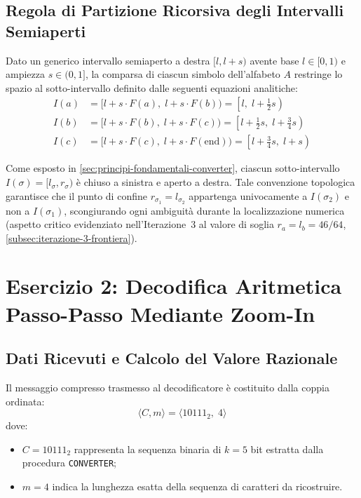 \FloatBarrier
\subsection{Regola di Partizione Ricorsiva degli Intervalli Semiaperti}
\label{subsec:regola-partizione-intervalli}

Dato un generico intervallo semiaperto a destra $[l, l + s)$ avente base $l \in [0, 1)$ e ampiezza $s \in (0, 1]$, la comparsa di ciascun simbolo dell'alfabeto $A$ restringe lo spazio al sotto-intervallo definito dalle seguenti equazioni analitiche:
\begin{align}
  I(a) &= [l + s \cdot F(a), \; l + s \cdot F(b)) = \left[ l, \; l + \frac{1}{2}s \right) \label{eq:intervallo-a} \\
  I(b) &= [l + s \cdot F(b), \; l + s \cdot F(c)) = \left[ l + \frac{1}{2}s, \; l + \frac{3}{4}s \right) \label{eq:intervallo-b} \\
  I(c) &= [l + s \cdot F(c), \; l + s \cdot F(\text{end})) = \left[ l + \frac{3}{4}s, \; l + s \right) \label{eq:intervallo-c}
\end{align}

Come esposto in \autoref{sec:principi-fondamentali-converter}, ciascun sotto-intervallo $I(\sigma) = [l_\sigma, r_\sigma)$ \`e chiuso a sinistra e aperto a destra. Tale convenzione topologica garantisce che il punto di confine $r_{\sigma_1} = l_{\sigma_2}$ appartenga univocamente a $I(\sigma_2)$ e non a $I(\sigma_1)$, scongiurando ogni ambiguit\`a durante la localizzazione numerica (aspetto critico evidenziato nell'Iterazione~3 al valore di soglia $r_a = l_b = 46/64$, \autoref{subsec:iterazione-3-frontiera}).

\FloatBarrier
\section{Esercizio 2: Decodifica Aritmetica Passo-Passo Mediante Zoom-In}
\label{sec:esercizio-aritmetica-zoom-in}

\subsection{Dati Ricevuti e Calcolo del Valore Razionale}
\label{subsec:valore-razionale-codeword}

Il messaggio compresso trasmesso al decodificatore \`e costituito dalla coppia ordinata:
\begin{equation}
  \langle C, m \rangle = \langle 10111_2, \; 4 \rangle
\end{equation}
dove:
\begin{itemize}
  \item $C = 10111_2$ rappresenta la sequenza binaria di $k = 5$ bit estratta dalla procedura \texttt{CONVERTER};
  \item $m = 4$ indica la lunghezza esatta della sequenza di caratteri da ricostruire.
\end{itemize}

